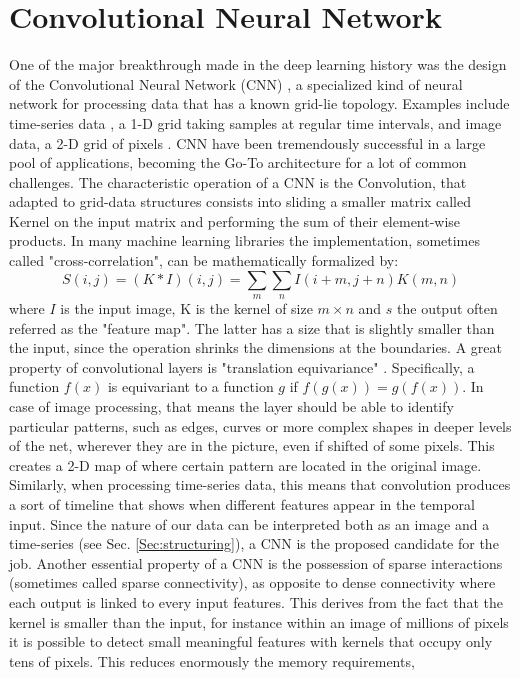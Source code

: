 \documentclass[binding=0.7cm, oneside]{sapthesis}
\begin{document}
\section{Convolutional Neural Network}
\label{sec:CNN}
One of the major breakthrough made in the deep learning history was the design of the Convolutional Neural Network (CNN) \cite{LeCun_CNN}, a specialized kind of neural network for
processing data that has a known grid-lie topology. Examples include time-series data \cite{time_conv,EEG_conv}, a 1-D grid taking samples at regular time intervals, and image data, a 2-D grid of pixels \cite{cnn_segment,class_cnn}.
CNN have been tremendously successful in a large pool of applications, becoming the Go-To architecture for a lot of common challenges. The characteristic operation of a CNN is the
Convolution, that adapted to grid-data structures consists into sliding a smaller matrix called Kernel on the input matrix and performing the sum of their element-wise products.
In many machine learning libraries the implementation, sometimes called "cross-correlation", can be mathematically formalized by:
$$S(i,j) = (K \ast I)(i,j) = \sum_{m}\sum_{n}I(i + m,j + n)K(m,n)$$
where $I$ is the input image, K is the kernel of size $m \times n$ and $s$ the output often referred as the "feature map". The latter has a size that is slightly smaller than the input,
since the operation shrinks the dimensions at the boundaries. A great property of convolutional layers is "translation equivariance" \cite{Goodfellow_DL}. Specifically,
a function $f(x)$ is equivariant to a function $g$ if $f(g(x)) = g(f(x))$. In case of image processing, that means the layer should be able to identify particular patterns,
such as edges, curves or more complex shapes in deeper levels of the net, wherever they are in the picture, even if shifted of some pixels.
This creates a 2-D map of where certain pattern are located in the original image. Similarly, when processing time-series data, this means that convolution produces a sort
of timeline that shows when different features appear in the temporal input. Since the nature of our data can be interpreted both as an image and a time-series (see Sec. \ref{Sec:structuring}),
a CNN is the proposed candidate for the job.
Another essential property of a CNN is the possession of sparse interactions (sometimes called sparse connectivity), as opposite to dense connectivity where each output is linked to every input features. This derives from the fact that the kernel is smaller than the input, for
instance within an image of millions of pixels it is possible to detect small meaningful features with kernels that occupy only tens of pixels. This reduces enormously the memory requirements,
\end{document}
